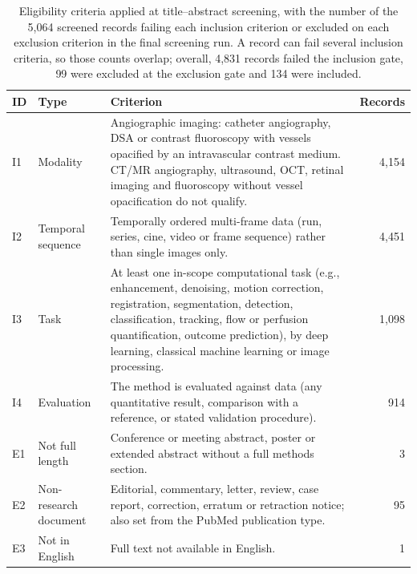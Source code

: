 \renewcommand{\arraystretch}{1.25}
\begin{table}[pos=ht]
\centering
\caption{Eligibility criteria applied at title--abstract screening, with the number of the 5,064 screened records failing each inclusion criterion or excluded on each exclusion criterion in the final screening run. A record can fail several inclusion criteria, so those counts overlap; overall, 4,831 records failed the inclusion gate, 99 were excluded at the exclusion gate and 134 were included.}
\label{tab:criteria}
\begin{tabularx}{\textwidth}{@{}l l X r@{}}
\toprule
\textbf{ID} & \textbf{Type} & \textbf{Criterion} & \textbf{Records} \\
\midrule
I1 & Modality
   & Angiographic imaging: catheter angiography, DSA or contrast fluoroscopy with vessels opacified by an intravascular contrast medium. CT/MR angiography, ultrasound, OCT, retinal imaging and fluoroscopy without vessel opacification do not qualify.
   & 4,154 \\
\dashedrule
I2 & Temporal sequence
   & Temporally ordered multi-frame data (run, series, cine, video or frame sequence) rather than single images only.
   & 4,451 \\
\dashedrule
I3 & Task
   & At least one in-scope computational task (e.g., enhancement, denoising, motion correction, registration, segmentation, detection, classification, tracking, flow or perfusion quantification, outcome prediction), by deep learning, classical machine learning or image processing.
   & 1,098 \\
\dashedrule
I4 & Evaluation
   & The method is evaluated against data (any quantitative result, comparison with a reference, or stated validation procedure).
   & 914 \\
\midrule
E1 & Not full length
   & Conference or meeting abstract, poster or extended abstract without a full methods section.
   & 3 \\
\dashedrule
E2 & Non-research document
   & Editorial, commentary, letter, review, case report, correction, erratum or retraction notice; also set from the PubMed publication type.
   & 95 \\
\dashedrule
E3 & Not in English
   & Full text not available in English.
   & 1 \\
\bottomrule
\end{tabularx}
\end{table}
